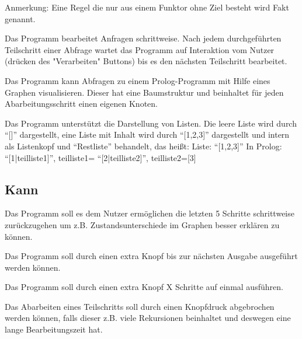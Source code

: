 \documentclass[parskip=full,11pt,twoside]{scrartcl}
\begin{document}
Anmerkung: Eine Regel die nur aus einem Funktor ohne Ziel besteht wird Fakt genannt.


Das Programm bearbeitet Anfragen schrittweise. Nach jedem durchgeführten Teilschritt einer Abfrage wartet das Programm auf Interaktion vom Nutzer (drücken des "Verarbeiten" Buttons) bis es den nächsten Teilschritt bearbeitet.


Das Programm kann Abfragen zu einem Prolog-Programm mit Hilfe eines Graphen visualisieren. Dieser hat eine Baumstruktur und beinhaltet für jeden Abarbeitungsschritt einen eigenen Knoten.


Das Programm unterstützt die Darstellung von Listen. Die leere Liste wird durch \enquote{[]} dargestellt, eine Liste mit Inhalt wird durch \enquote{[1,2,3]} dargestellt und intern als Listenkopf und \enquote{Restliste} behandelt, das heißt:\newline
Liste: \enquote{[1,2,3]}\newline
In Prolog: \enquote{[1|teilliste1]}, teilliste1= \enquote{[2|teilliste2]}, teilliste2=[3]

\subsection{Kann}


Das Programm soll es dem Nutzer ermöglichen die letzten 5 Schritte schrittweise zurückzugehen um z.B. Zustandsunterschiede im Graphen besser erklären zu können.


Das Programm soll durch einen extra Knopf bis zur nächsten Ausgabe ausgeführt werden können.


Das Programm soll durch einen extra Knopf X Schritte auf einmal ausführen.


Das Abarbeiten eines Teilschritts soll durch einen Knopfdruck abgebrochen werden können, falls dieser z.B. viele Rekursionen beinhaltet und deswegen eine lange Bearbeitungszeit hat.
\end{document}
